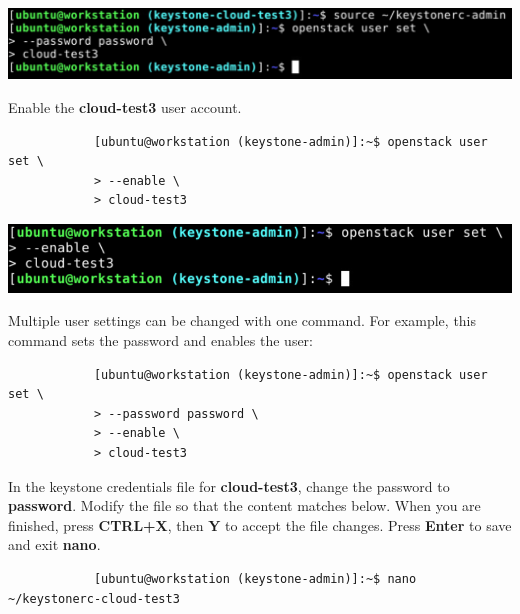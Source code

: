 \documentclass[letterpaper, 12pt]{article}
\begin{document}
\begin{enumerate}
\begin{labstep}
        \begin{center}
            \includegraphics[width=\linewidth]{images/part4/step17.png}
        \end{center}
    \end{labstep}

    \begin{labstep}
        Enable the \textbf{cloud-test3} user account.
        \begin{lstlisting}
            [ubuntu@workstation (keystone-admin)]:~$ openstack user set \
            > --enable \
            > cloud-test3
        \end{lstlisting}

        \begin{center}
            \includegraphics[width=\linewidth]{images/part4/step18.png}
        \end{center}
    \end{labstep}

    \begin{tipbox}
        Multiple user settings can be changed with one command.
        For example, this command sets the password and enables the user:
        \begin{lstlisting}
            [ubuntu@workstation (keystone-admin)]:~$ openstack user set \
            > --password password \
            > --enable \
            > cloud-test3
        \end{lstlisting}
    \end{tipbox}

    \begin{labstep}
        In the keystone credentials file for \textbf{cloud-test3}, change the password to \textbf{password}.
        Modify the file so that the content matches below.
        When you are finished, press \textbf{CTRL+X}, then \textbf{Y} to accept the file changes.
        Press \textbf{Enter} to save and exit \textbf{nano}.
        \begin{lstlisting}
            [ubuntu@workstation (keystone-admin)]:~$ nano ~/keystonerc-cloud-test3
        \end{lstlisting}


\end{labstep}
\end{enumerate}
\end{document}
